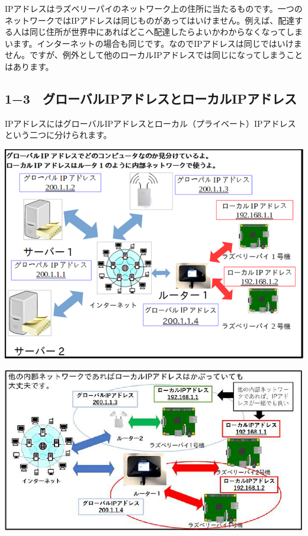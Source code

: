 \documentclass[a4paper,12pt,dvipdfmx]{jarticle}
\begin{document}
\bigskip


\bigskip


\bigskip


\bigskip


\bigskip


\bigskip


\bigskip

IPアドレスはラズベリーパイのネットワーク上の住所に当たるものです。一つのネットワークではIPアドレスは同じものがあってはいけません。例えば、配達する人は同じ住所が世界中にあればどこへ配達したらよいかわからなくなってしまいます。インターネットの場合も同じです。なのでIPアドレスは同じではいけません。ですが、例外として他のローカルIPアドレスでは同じになってしまうことはあります。%

\clearpage\subsection*{\bfseries
	1−3　グローバルIPアドレスとローカルIPアドレス}
IPアドレスにはグローバルIPアドレスとローカル（プライベート）IPアドレスという二つに分けられます。



\centering
\includegraphics[width=15.0cm]{ome7-img005.png}

\centering
\includegraphics[width=15.0cm]{ome7-img006}
\flushleft
\end{document}
